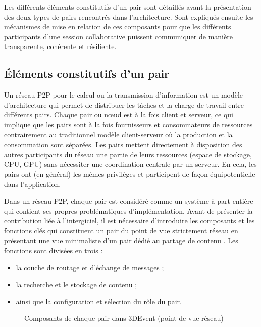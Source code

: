 Les différents éléments constitutifs d'un pair sont détaillés avant la présentation 
des deux types de pairs rencontrés dans l'architecture.
Sont expliqués ensuite les mécanismes de mise en relation de 
ces composants pour que les différents participants d'une session 
collaborative puissent communiquer de manière transparente, cohérente et 
résiliente.




\subsection{Éléments constitutifs d'un pair}
Un réseau \gls{P2P} pour le calcul ou la transmission d’information est un modèle 
d’architecture qui permet de distribuer les tâches et la charge de travail entre 
différents pairs. Chaque pair ou \og n\oe ud\fg{} est à la fois client et serveur, ce 
qui implique que les pairs sont à la fois fournisseurs et consommateurs de 
ressources contrairement au traditionnel modèle client-serveur où la production et 
la consommation sont séparées. Les pairs mettent directement à disposition des 
autres participants du réseau une partie de leurs ressources (espace de stockage, 
CPU, GPU) sans nécessiter une coordination centrale par un serveur. En cela, les 
pairs ont (en général) les mêmes privilèges et participent de façon équipotentielle 
dans l’application.

Dans un réseau \gls{P2P}, chaque pair est considéré comme un système à part 
entière qui contient ses propres problématiques d'implémentation. Avant de 
présenter la contribution liée à l'intergiciel, il est nécessaire d'introduire les 
composants et les fonctions clés qui constituent un pair du point de 
vue strictement réseau en présentant une vue minimaliste d'un pair dédié au 
partage de contenu \cite[p.135-136]{Buford2009}. Les 
fonctions sont divisées en trois :
\begin{itemize}
	\item la couche de routage et d'échange de messages ;
	\item la recherche et le stockage de contenu ;
	\item ainsi que la configuration et sélection du rôle du pair.
\end{itemize}


\begin{figure}[ht]
	\centering
	\caption{Composants de chaque pair dans 3DEvent (point de vue réseau)}
	\label{fig:middleware}
\end{figure}


